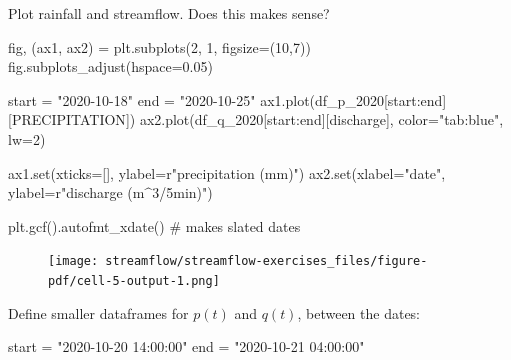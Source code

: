 \documentclass[
  letterpaper,
  DIV=11,
  numbers=noendperiod]{scrreprt}
\newenvironment{Shaded}{\begin{snugshade}}{\end{snugshade}}
\newcommand{\BuiltInTok}[1]{\textcolor[rgb]{0.00,0.23,0.31}{#1}}
\newcommand{\CommentTok}[1]{\textcolor[rgb]{0.37,0.37,0.37}{#1}}
\newcommand{\DecValTok}[1]{\textcolor[rgb]{0.68,0.00,0.00}{#1}}
\newcommand{\FloatTok}[1]{\textcolor[rgb]{0.68,0.00,0.00}{#1}}
\newcommand{\NormalTok}[1]{\textcolor[rgb]{0.00,0.23,0.31}{#1}}
\newcommand{\OperatorTok}[1]{\textcolor[rgb]{0.37,0.37,0.37}{#1}}
\newcommand{\StringTok}[1]{\textcolor[rgb]{0.13,0.47,0.30}{#1}}
\newcommand{\VerbatimStringTok}[1]{\textcolor[rgb]{0.13,0.47,0.30}{#1}}
\begin{document}
Plot rainfall and streamflow. Does this makes sense?

\begin{Shaded}
\begin{Highlighting}[]
\NormalTok{fig, (ax1, ax2) }\OperatorTok{=}\NormalTok{ plt.subplots(}\DecValTok{2}\NormalTok{, }\DecValTok{1}\NormalTok{, figsize}\OperatorTok{=}\NormalTok{(}\DecValTok{10}\NormalTok{,}\DecValTok{7}\NormalTok{))}
\NormalTok{fig.subplots\_adjust(hspace}\OperatorTok{=}\FloatTok{0.05}\NormalTok{)}

\NormalTok{start }\OperatorTok{=} \StringTok{"2020{-}10{-}18"}
\NormalTok{end }\OperatorTok{=} \StringTok{"2020{-}10{-}25"}
\NormalTok{ax1.plot(df\_p\_2020[start:end][}\StringTok{\textquotesingle{}PRECIPITATION\textquotesingle{}}\NormalTok{])}
\NormalTok{ax2.plot(df\_q\_2020[start:end][}\StringTok{\textquotesingle{}discharge\textquotesingle{}}\NormalTok{], color}\OperatorTok{=}\StringTok{"tab:blue"}\NormalTok{, lw}\OperatorTok{=}\DecValTok{2}\NormalTok{)}

\NormalTok{ax1.}\BuiltInTok{set}\NormalTok{(xticks}\OperatorTok{=}\NormalTok{[],}
\NormalTok{        ylabel}\OperatorTok{=}\VerbatimStringTok{r"precipitation (mm)"}\NormalTok{)}
\NormalTok{ax2.}\BuiltInTok{set}\NormalTok{(xlabel}\OperatorTok{=}\StringTok{"date"}\NormalTok{,}
\NormalTok{        ylabel}\OperatorTok{=}\VerbatimStringTok{r"discharge (m$\^{}3$/5min)"}\NormalTok{)}

\NormalTok{plt.gcf().autofmt\_xdate()  }\CommentTok{\# makes slated dates}
\end{Highlighting}
\end{Shaded}

\begin{figure}[H]

{\centering \texttt{[image: streamflow/streamflow-exercises\_files/figure-pdf/cell-5-output-1.png]}

}

\end{figure}

Define smaller dataframes for \(p(t)\) and \(q(t)\), between the dates:

\begin{Shaded}
\begin{Highlighting}[]
\NormalTok{start }\OperatorTok{=} \StringTok{"2020{-}10{-}20 14:00:00"}
\NormalTok{end }\OperatorTok{=} \StringTok{"2020{-}10{-}21 04:00:00"}
\end{Highlighting}
\end{Shaded}
\end{document}
